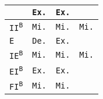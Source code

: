 \begin{tabular}{|l||c|c|c|}
 & \cellcolor{orange!60}\texttt{Ex.}
 & \cellcolor{orange!60}\texttt{Ex.}
 & \cellcolor{black!40}
 \\
 \hline

 \texttt{II\textsuperscript{B}}

 & \cellcolor{olive!80}\texttt{Mi.}
 & \cellcolor{olive!80}\texttt{Mi.}
 & \cellcolor{olive!80}\texttt{Mi.}
 \\
 \hline

 \texttt{E}

 & \cellcolor{blue!40}\texttt{De.}
 & \cellcolor{orange!60}\texttt{Ex.}
 & \cellcolor{black!40}
 \\
 \hline

 \texttt{IE\textsuperscript{B}}
 & \cellcolor{olive!80}\texttt{Mi.}
 & \cellcolor{olive!80}\texttt{Mi.}
 & \cellcolor{olive!80}\texttt{Mi.}
 \\
 \hline

 \texttt{EI\textsuperscript{B}}
 & \cellcolor{orange!60}\texttt{Ex.}
 & \cellcolor{orange!60}\texttt{Ex.}
 & \cellcolor{black!40}
 \\
 \hline

 \texttt{FI\textsuperscript{B}}

 & \cellcolor{olive!80}\texttt{Mi.}
 & \cellcolor{olive!80}\texttt{Mi.}
 & \cellcolor{black!40}
 \\
 \hline

\end{tabular}%
